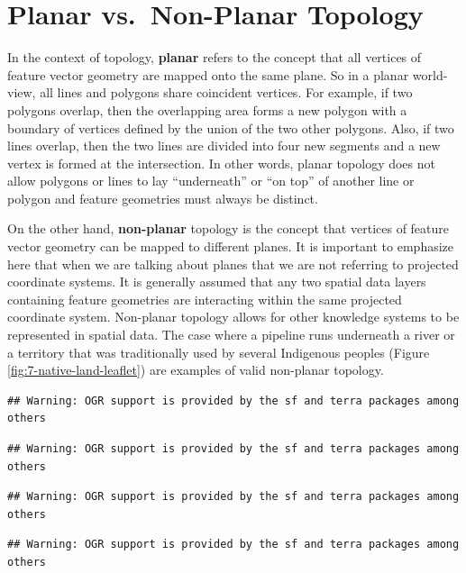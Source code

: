 \documentclass[
]{book}
\begin{document}
\hypertarget{planar-vs.-non-planar-topology}{%
\section{Planar vs.~Non-Planar Topology}\label{planar-vs.-non-planar-topology}}

In the context of topology, \textbf{planar} refers to the concept that all vertices of feature vector geometry are mapped onto the same plane. So in a planar world-view, all lines and polygons share coincident vertices. For example, if two polygons overlap, then the overlapping area forms a new polygon with a boundary of vertices defined by the union of the two other polygons. Also, if two lines overlap, then the two lines are divided into four new segments and a new vertex is formed at the intersection. In other words, planar topology does not allow polygons or lines to lay ``underneath'' or ``on top'' of another line or polygon and feature geometries must always be distinct.

On the other hand, \textbf{non-planar} topology is the concept that vertices of feature vector geometry can be mapped to different planes. It is important to emphasize here that when we are talking about planes that we are not referring to projected coordinate systems. It is generally assumed that any two spatial data layers containing feature geometries are interacting within the same projected coordinate system. Non-planar topology allows for other knowledge systems to be represented in spatial data. The case where a pipeline runs underneath a river or a territory that was traditionally used by several Indigenous peoples (Figure \ref{fig:7-native-land-leaflet}) are examples of valid non-planar topology.

\begin{verbatim}
## Warning: OGR support is provided by the sf and terra packages among others
\end{verbatim}

\begin{verbatim}
## Warning: OGR support is provided by the sf and terra packages among others
\end{verbatim}

\begin{verbatim}
## Warning: OGR support is provided by the sf and terra packages among others
\end{verbatim}

\begin{verbatim}
## Warning: OGR support is provided by the sf and terra packages among others
\end{verbatim}
\end{document}
